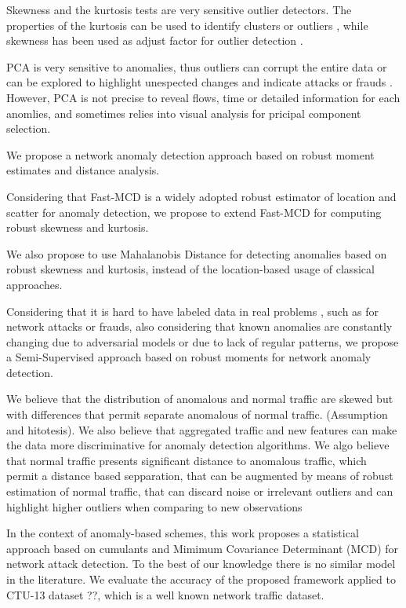 \documentclass[review]{elsarticle}
\begin{document}
Skewness and the kurtosis tests are very sensitive outlier detectors. The properties of the kurtosis can be used to identify clusters or outliers \cite{pena2010eigenvectors}, while skewness has been used as adjust factor for outlier detection \cite{hubert2008outlier}.

PCA is very sensitive to anomalies, thus outliers can corrupt the entire data or can be explored to highlight unespected changes and indicate attacks or frauds \cite{callegari2011novel,Lee2013,vieira2017model}. However, PCA is not precise to reveal flows, time or detailed information for each anomlies, and sometimes relies into visual analysis for pricipal component selection.

We propose a network anomaly detection approach based on robust moment estimates and distance analysis.

Considering that Fast-MCD is a widely adopted robust estimator of location and scatter for anomaly detection, we propose to extend Fast-MCD for computing robust skewness and kurtosis.

We also propose to use Mahalanobis Distance for detecting anomalies based on robust skewness and kurtosis, instead of the location-based usage of classical approaches.

Considering that it is hard to have labeled data in real problems \cite{osanaiye2016distributed}, such as for network attacks or frauds, also considering that known anomalies are constantly changing due to adversarial models or due to lack of regular patterns, we propose a Semi-Supervised approach based on robust moments for network anomaly detection.

We believe that the distribution of anomalous and normal traffic are skewed but with differences that permit separate anomalous of normal traffic. (Assumption and hitotesis). We also believe that aggregated traffic and new features can make the data more discriminative for anomaly detection algorithms. We algo believe that normal traffic presents significant distance to anomalous traffic, which permit a distance based sepparation, that can be augmented by means of robust estimation of normal traffic, that can discard noise or irrelevant outliers and can highlight higher outliers when comparing to new observations

In the context of anomaly-based schemes, this work proposes a statistical approach based on cumulants and Mimimum Covariance Determinant (MCD) for network attack detection. To the best of our knowledge there is no similar model in the literature. We evaluate the accuracy of the proposed framework applied to CTU-13 dataset ??, which is a well known network traffic dataset.
\end{document}
